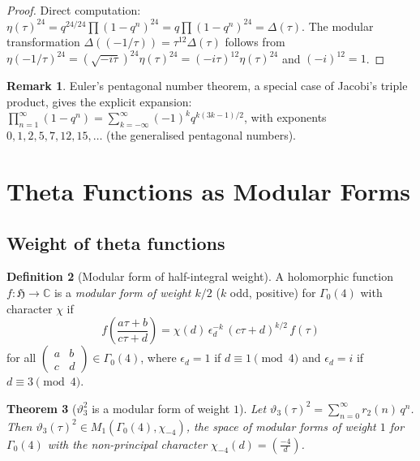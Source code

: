 \documentclass[12pt,a4paper]{amsart}
\newtheorem{theorem}{Theorem}[section]
\theoremstyle{definition}
\newtheorem{definition}[theorem]{Definition}
\newtheorem{remark}[theorem]{Remark}
\begin{document}
\begin{proof}
Direct computation: $\eta(\tau)^{24} = q^{24/24}\prod(1-q^n)^{24} = q\prod(1-q^n)^{24} = \Delta(\tau)$.
The modular transformation $\Delta((-1/\tau)) = \tau^{12}\Delta(\tau)$ follows from
$\eta(-1/\tau)^{24} = (\sqrt{-i\tau})^{24}\eta(\tau)^{24} = (-i\tau)^{12}\eta(\tau)^{24}$
and $(-i)^{12} = 1$.
\end{proof}

\begin{remark}
Euler's pentagonal number theorem, a special case of Jacobi's triple product,
gives the explicit expansion:
$\prod_{n=1}^{\infty}(1-q^n) = \sum_{k=-\infty}^{\infty}(-1)^k q^{k(3k-1)/2}$,
with exponents $0,1,2,5,7,12,15,\ldots$ (the generalised pentagonal numbers).
\end{remark}

\section{Theta Functions as Modular Forms}\label{sec:modular}

\subsection{Weight of theta functions}

\begin{definition}[Modular form of half-integral weight]
A holomorphic function $f : \mathfrak{H} \to \mathbb{C}$ is a \emph{modular form
of weight $k/2$} ($k$ odd, positive) for $\Gamma_0(4)$ with character $\chi$ if
\[
  f\!\left(\frac{a\tau+b}{c\tau+d}\right)
  = \chi(d)\,\epsilon_d^{-k}\,(c\tau+d)^{k/2}\,f(\tau)
\]
for all $\begin{pmatrix}a&b\\c&d\end{pmatrix}\in\Gamma_0(4)$, where
$\epsilon_d = 1$ if $d\equiv 1\pmod{4}$ and $\epsilon_d = i$ if $d\equiv 3\pmod{4}$.
\end{definition}

\begin{theorem}[$\vartheta_3^2$ is a modular form of weight $1$]\label{thm:theta3_weight1}
Let $\vartheta_3(\tau)^2 = \sum_{n=0}^{\infty} r_2(n)\, q^n$.
Then $\vartheta_3(\tau)^2 \in M_1(\Gamma_0(4), \chi_{-4})$,
the space of modular forms of weight $1$ for $\Gamma_0(4)$
with the non-principal character $\chi_{-4}(d) = \left(\frac{-4}{d}\right)$.
\end{theorem}
\end{document}
